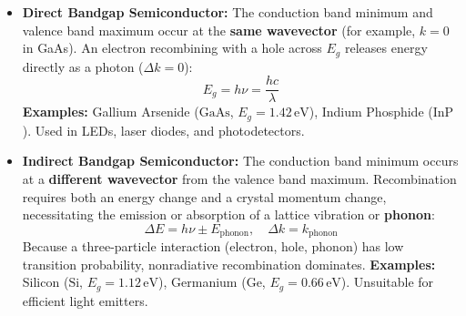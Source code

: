 \documentclass[12pt,a4paper]{article}
\begin{document}
\begin{itemize}[leftmargin=*, itemsep=3.5pt]
  \item \textbf{Direct Bandgap Semiconductor:} The conduction band minimum and valence band maximum occur at the \textbf{same wavevector} (for example, $k=0$ in GaAs). An electron recombining with a hole across $E_g$ releases energy directly as a photon ($\Delta k = 0$):
  \begin{equation}
    E_g = h\nu = \frac{hc}{\lambda}
  \end{equation}
  \textbf{Examples:} Gallium Arsenide ($\text{GaAs}$, $E_g = 1.42\,\text{eV}$), Indium Phosphide ($\text{InP}$). Used in LEDs, laser diodes, and photodetectors.
  \item \textbf{Indirect Bandgap Semiconductor:} The conduction band minimum occurs at a \textbf{different wavevector} from the valence band maximum. Recombination requires both an energy change and a crystal momentum change, necessitating the emission or absorption of a lattice vibration or \textbf{phonon}:
  \begin{equation}
    \Delta E = h\nu \pm E_{\text{phonon}}, \quad \Delta k = k_{\text{phonon}}
  \end{equation}
  Because a three-particle interaction (electron, hole, phonon) has low transition probability, nonradiative recombination dominates.
  \textbf{Examples:} Silicon ($\text{Si}$, $E_g = 1.12\,\text{eV}$), Germanium ($\text{Ge}$, $E_g = 0.66\,\text{eV}$). Unsuitable for efficient light emitters.
\end{itemize}
\end{document}
